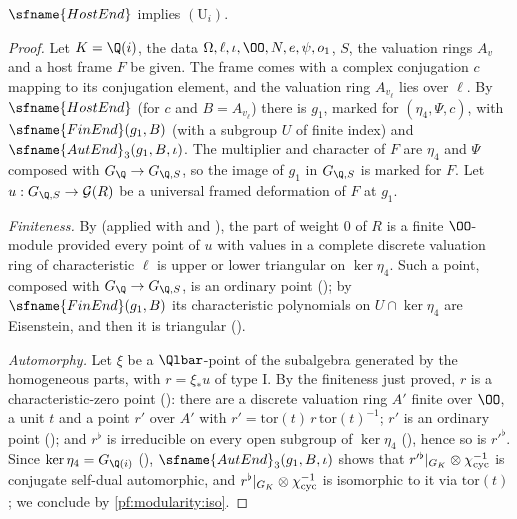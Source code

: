 \begin{theorem}\label{pf:modularity:symcube}
$\sfname{HostEnd}$ implies $(\mathrm{U}_i)$.
\end{theorem}

\begin{proof}
Let $K=\Q(i)$, the data $\Omega,\ell,\iota,\OO,N,e,\psi,o_1$, $S$, the valuation rings $A_v$ and a host frame $F$ be
given. The frame comes with a complex conjugation $c$ mapping to its conjugation element, and the valuation ring
$A_{v_\ell}$ lies over $\ell$. By $\sfname{HostEnd}$ (for $c$ and $B=A_{v_\ell}$) there is $g_1$, marked for
$(\eta_4,\Psi,c)$, with $\sfname{FinEnd}(g_1,B)$ (with a subgroup $U$ of finite index) and $\sfname{AutEnd}_3(g_1,B,\iota)$.
The multiplier and character of $F$ are $\eta_4$ and $\Psi$ composed with $G_\Q\to G_{\Q,S}$, so the image of $g_1$ in
$G_{\Q,S}$ is marked for $F$. Let $u:G_{\Q,S}\to\modularityG(R)$ be a universal framed deformation of $F$ at $g_1$.

\emph{Finiteness.} By  (applied
with  and ),
the part of weight $0$ of $R$ is a finite $\OO$-module provided every point of $u$ with values in a complete discrete
valuation ring of characteristic $\ell$ is upper or lower triangular on $\ker\eta_4$. Such a point, composed with
$G_\Q\to G_{\Q,S}$, is an ordinary point (); by $\sfname{FinEnd}(g_1,B)$ its
characteristic polynomials on $U\cap\ker\eta_4$ are Eisenstein, and then it is triangular ().

\emph{Automorphy.} Let $\xi$ be a $\Qlbar$-point of the subalgebra generated by the homogeneous parts, with
$r=\xi_\ast u$ of type I. By the finiteness just proved, $r$ is a characteristic-zero point
(): there are a discrete valuation ring $A'$ finite
over $\OO$, a unit $t$ and a point $r'$ over $A'$ with $r'=\mathrm{tor}(t)\,r\,\mathrm{tor}(t)^{-1}$; $r'$ is an ordinary
point (); and $r^\flat$ is irreducible on every open subgroup of
$\ker\eta_4$ (), hence so is $r'^\flat$. Since
$\ker\eta_4=G_{\Q(i)}$ (),
$\sfname{AutEnd}_3(g_1,B,\iota)$ shows that $r'^\flat|_{G_K}\otimes\chi_{\mathrm{cyc}}^{-1}$ is conjugate self-dual automorphic,
and $r^\flat|_{G_K}\otimes\chi_{\mathrm{cyc}}^{-1}$ is isomorphic to it via $\mathrm{tor}(t)$; we conclude by
\cref{pf:modularity:iso}.
\end{proof}

